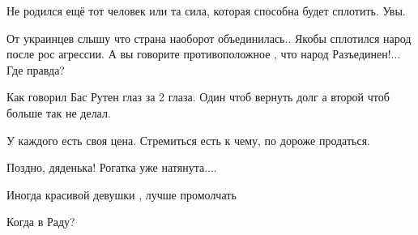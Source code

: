 Не родился ещё тот человек или та сила, которая способна будет сплотить. Увы.


От украинцев слышу что страна наоборот объединилась.. Якобы сплотился народ
после рос агрессии. А вы говорите противоположное , что народ Разъединен!...
Где правда?


Как говорил Бас Рутен глаз за 2 глаза. Один чтоб вернуть долг а второй чтоб
больше так не делал.

 
У каждого есть своя цена. Стремиться есть к чему, по дороже продаться.

 
Поздно, дяденька! Рогатка уже натянута....

 
Иногда красивой девушки , лучше промолчать

 
Когда в Раду?

 
